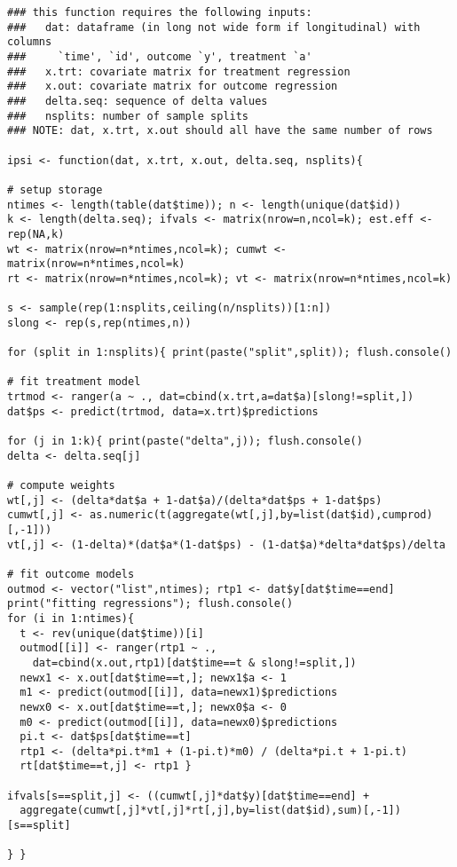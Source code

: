 \documentclass[12pt]{article}
\theoremstyle{remark}
\begin{document}
\begin{verbatim}
### this function requires the following inputs:
###   dat: dataframe (in long not wide form if longitudinal) with columns
###     `time', `id', outcome `y', treatment `a'
###   x.trt: covariate matrix for treatment regression
###   x.out: covariate matrix for outcome regression
###   delta.seq: sequence of delta values
###   nsplits: number of sample splits
### NOTE: dat, x.trt, x.out should all have the same number of rows

ipsi <- function(dat, x.trt, x.out, delta.seq, nsplits){

# setup storage
ntimes <- length(table(dat$time)); n <- length(unique(dat$id))
k <- length(delta.seq); ifvals <- matrix(nrow=n,ncol=k); est.eff <- rep(NA,k)
wt <- matrix(nrow=n*ntimes,ncol=k); cumwt <- matrix(nrow=n*ntimes,ncol=k)
rt <- matrix(nrow=n*ntimes,ncol=k); vt <- matrix(nrow=n*ntimes,ncol=k)

s <- sample(rep(1:nsplits,ceiling(n/nsplits))[1:n])
slong <- rep(s,rep(ntimes,n))

for (split in 1:nsplits){ print(paste("split",split)); flush.console()

# fit treatment model
trtmod <- ranger(a ~ ., dat=cbind(x.trt,a=dat$a)[slong!=split,])
dat$ps <- predict(trtmod, data=x.trt)$predictions 

for (j in 1:k){ print(paste("delta",j)); flush.console()
delta <- delta.seq[j]

# compute weights
wt[,j] <- (delta*dat$a + 1-dat$a)/(delta*dat$ps + 1-dat$ps)
cumwt[,j] <- as.numeric(t(aggregate(wt[,j],by=list(dat$id),cumprod)[,-1]))
vt[,j] <- (1-delta)*(dat$a*(1-dat$ps) - (1-dat$a)*delta*dat$ps)/delta

# fit outcome models
outmod <- vector("list",ntimes); rtp1 <- dat$y[dat$time==end]
print("fitting regressions"); flush.console()
for (i in 1:ntimes){ 
  t <- rev(unique(dat$time))[i]
  outmod[[i]] <- ranger(rtp1 ~ ., 
    dat=cbind(x.out,rtp1)[dat$time==t & slong!=split,])
  newx1 <- x.out[dat$time==t,]; newx1$a <- 1
  m1 <- predict(outmod[[i]], data=newx1)$predictions
  newx0 <- x.out[dat$time==t,]; newx0$a <- 0
  m0 <- predict(outmod[[i]], data=newx0)$predictions
  pi.t <- dat$ps[dat$time==t]
  rtp1 <- (delta*pi.t*m1 + (1-pi.t)*m0) / (delta*pi.t + 1-pi.t)
  rt[dat$time==t,j] <- rtp1 }
  
ifvals[s==split,j] <- ((cumwt[,j]*dat$y)[dat$time==end] + 
  aggregate(cumwt[,j]*vt[,j]*rt[,j],by=list(dat$id),sum)[,-1])[s==split]

} }


\end{verbatim}
\end{document}
